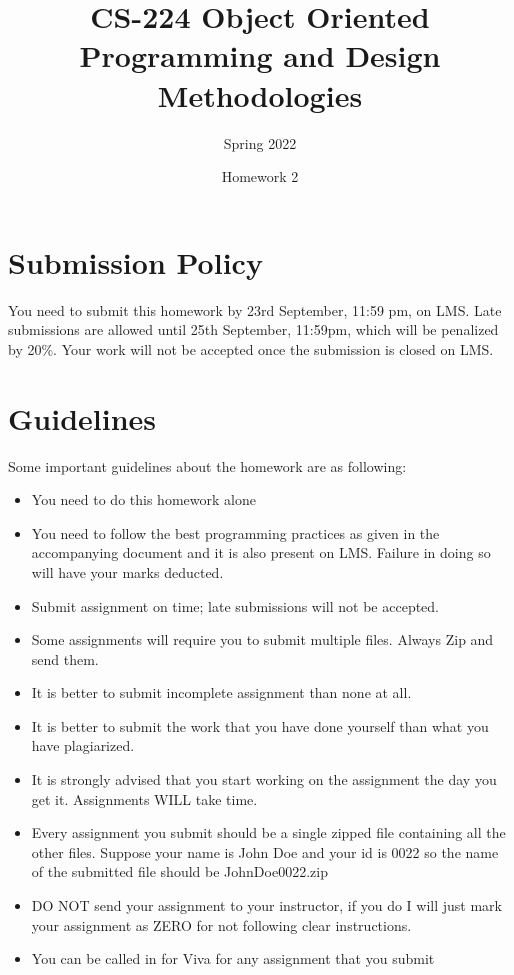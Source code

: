 \documentclass[a4paper,12pt]{article}
\begin{document}
	
	\title{CS-224 Object Oriented Programming and Design Methodologies }
	\author{Spring 2022}
	\date{Homework 2}
	\maketitle
	\section{Submission Policy}
	You need to submit this homework by {\color{blue}23rd September, 11:59 pm}, on LMS. Late submissions are allowed until {\color{red} 25th September, 11:59pm}, which will be penalized by 20\%. Your work will not be accepted once the submission is closed on LMS.
	
	\section{Guidelines}
		Some important guidelines about the homework are as following:
	\begin{itemize}
		\item You need to do this homework alone

		\item You need to follow the best programming practices as given in the accompanying document and it is also present on LMS. Failure in doing so will have your marks deducted.
		\item Submit assignment on time; late submissions will not be accepted.
		\item Some assignments will require you to submit multiple files. Always Zip and send them.
		\item It is better to submit incomplete assignment than none at all.
		\item It is better to submit the work that you have done yourself than what you have plagiarized.
		\item It is strongly advised that you start working on the assignment the day you get it. Assignments WILL take time.
		\item Every assignment you submit should be a single zipped file containing all the other files. Suppose your name is John Doe and your id is 0022 so the name of the submitted file should be JohnDoe0022.zip
		\item DO NOT send your assignment to your instructor, if you do I will just mark your assignment as ZERO for not following clear instructions.
		\item You can be called in for Viva for any assignment that you submit
	\end{itemize}
	
\end{document}

